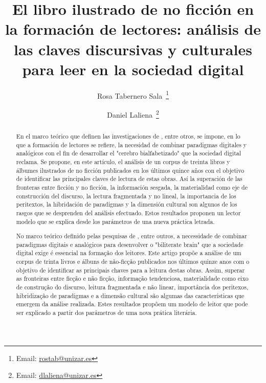 \documentclass[spanish]{textolivre}
\title{El libro ilustrado de no ficción en la formación de lectores: análisis de las claves discursivas y culturales para leer en la sociedad digital}
\author[1]{Rosa Tabernero Sala~\orcid{0000-0002-2332-5807}\thanks{Email: \href{mailto:rostab@unizar.es}{rostab@unizar.es}}}
\author[1]{Daniel Laliena~\orcid{0000-0001-9476-8472}\thanks{Email: \href{mailto:dlaliena@unizar.es}{dlaliena@unizar.es}}}
\affil[1]{Universidad de Zaragoza, Facultad de Ciencias Humanas y de la Educación, Departamento Didácticas Específicas (Área de Didáctica de la Lengua y la Literatura), Huesca, España.}
\begin{document}
\maketitle

\begin{polyabstract}
\begin{abstract}
En el marco teórico que definen las investigaciones de \textcite{wolf_lector_2020,delgado_dont_2018,gil_lectura_2020}, entre otros, se impone, en lo que a formación de lectores se refiere, la necesidad de combinar paradigmas digitales y analógicos con el fin de desarrollar el "cerebro bialfabetizado" \cite{wolf_lector_2020} que la sociedad digital reclama. Se propone, en este artículo, el análisis de un corpus de treinta libros y álbumes ilustrados de no ficción publicados en los últimos quince años con el objetivo de identificar las principales claves de lectura de estas obras. Así la superación de las fronteras entre ficción y no ficción, la información sesgada, la materialidad como eje de construcción del discurso, la lectura fragmentada y no lineal, la importancia de los peritextos, la hibridación de paradigmas y la dimensión cultural son algunos de los rasgos que se desprenden del análisis efectuado. Estos resultados proponen un lector modelo que se explica desde los parámetros de una nueva práctica letrada.

\end{abstract}

\begin{portuguese}
\begin{abstract}
No marco teórico definido pelas pesquisas de \textcite{wolf_lector_2020,delgado_dont_2018,gil_lectura_2020}, entre outros, a necessidade de combinar paradigmas digitais e analógicos para desenvolver o "biliterate brain" \cite{wolf_lector_2020} que a sociedade digital exige é essencial na formação dos leitores. Este artigo propõe a análise de um corpus de trinta livros e álbuns de não-ficção publicados nos últimos quinze anos com o objetivo de identificar as principais chaves para a leitura destas obras. Assim, superar as fronteiras entre ficção e não ficção, informação tendenciosa, materialidade como eixo de construção do discurso, leitura fragmentada e não linear, importância dos peritexos, hibridização de paradigmas e a dimensão cultural são algumas das características que emergem da análise realizada. Estes resultados propõem um modelo de leitor que pode ser explicado a partir dos parâmetros de uma nova prática literária.


\end{abstract}
\end{portuguese}
\end{polyabstract}
\end{document}
